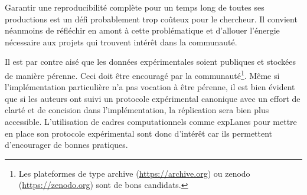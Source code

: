 Garantir une reproducibilité complète pour un temps long de toutes ses productions est un défi probablement trop coûteux pour le chercheur. Il convient néanmoins de réfléchir en amont à cette problématique et d'allouer l'énergie nécessaire aux projets qui trouvent intérêt dans la communauté.

Il est par contre aisé que les données expérimentales soient publiques et stockées de manière pérenne. Ceci doit être encouragé par la communauté\footnote{Les plateformes de type archive (\url{https://archive.org}) ou zenodo (\url{https://zenodo.org}) sont de bons candidats.}. Même si l'implémentation particulière n'a pas vocation à être pérenne, il est bien évident que si les auteurs ont suivi un protocole expérimental canonique avec un effort de clarté et de concision dans l'implémentation, la réplication sera bien plus accessible. L'utilisation de cadres computationnels comme expLanes pour mettre en place son protocole expérimental sont donc d'intérêt car ils permettent d'encourager de bonnes pratiques.

